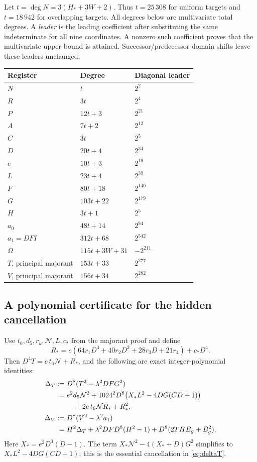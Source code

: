 Let \(t=\deg N=3(H_*+3W+2)\). Thus \(t=25\,308\) for uniform targets
and \(t=18\,942\) for overlapping targets. All degrees below are
multivariate total degrees. A \emph{leader} is the leading coefficient
after substituting the same indeterminate for all nine coordinates.
A nonzero such coefficient proves that the multivariate upper bound
is attained. Successor/predecessor domain shifts leave these leaders unchanged.

\begin{center}
\begin{tabular}{@{}lll@{}}
\toprule Register & Degree & Diagonal leader\\\midrule
\(N\) & \(t\) & \(2^2\)\\
\(R\) & \(3t\) & \(2^4\)\\
\(P\) & \(12t+3\) & \(2^{21}\)\\
\(A\) & \(7t+2\) & \(2^{12}\)\\
\(C\) & \(3t\) & \(2^5\)\\
\(D\) & \(20t+4\) & \(2^{34}\)\\
\(e\) & \(10t+3\) & \(2^{19}\)\\
\(L\) & \(23t+4\) & \(2^{39}\)\\
\(F\) & \(80t+18\) & \(2^{140}\)\\
\(G\) & \(103t+22\) & \(2^{179}\)\\
\(H\) & \(3t+1\) & \(2^5\)\\
\(a_0\) & \(48t+14\) & \(2^{84}\)\\
\(a_1=DFI\) & \(312t+68\) & \(2^{542}\)\\
\(\Omega\) & \(115t+3W+31\) & \(-2^{211}\)\\
\(T\), principal majorant & \(153t+33\) & \(2^{277}\)\\
\(V\), principal majorant & \(156t+34\) & \(2^{282}\)\\
\bottomrule
\end{tabular}
\end{center}

\subsection{A polynomial certificate for the hidden cancellation}
Use \(t_6,d_5,r_k,\mathcal N,L,c_*\) from the majorant proof and define
\[
 R_*=
 e(64r_1D^3+40r_2D^2+28r_3D+21r_4)+c_*D^4 .
\]
Then \(D^4T=e\,t_6\mathcal N+R_*\), and the following are exact
integer-polynomial identities:
\begin{align}
 \Delta_T:={}&D^8(T^2-\lambda^2DFG^2)\notag\\
 ={}&e^2d_5\mathcal N^2
 +1024^2D^8\bigl(X_*L^2-4DG(CD+1)\bigr)\notag\\
 &\quad+2e\,t_6\mathcal N R_*+R_*^2,\label{eq:deltaT}\\
 \Delta_V:={}&D^8(V^2-\lambda^2a_1)\notag\\
 ={}&H^2\Delta_T+\lambda^2DFD^8(H^2-1)
              +D^8(2THB_g+B_g^2).\label{eq:deltaV}
\end{align}
Here \(X_*=e^2D^3(D-1)\). The term
\(X_*\mathcal N^2-4(X_*+D)G^2\) simplifies to
\(X_*L^2-4DG(CD+1)\); this is the essential cancellation
in \eqref{eq:deltaT}.

